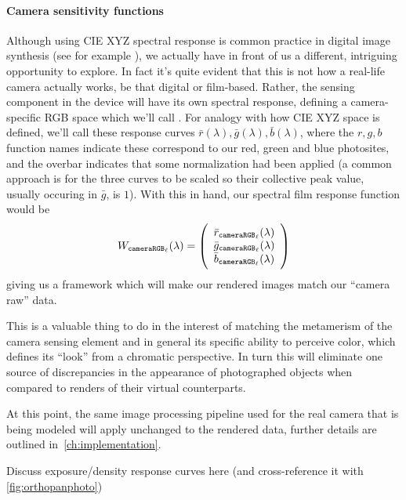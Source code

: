 \paragraph{Camera sensitivity functions}
Although using \gls{CIE} \gls{XYZ} spectral response is common practice
in digital image synthesis (see for example \cite{pharr2023, jakob2022mitsuba3,
ward1994}), we actually have in front of us a different, intriguing opportunity
to explore. 
In fact it's quite evident that this is not how a real-life camera actually works,
be that digital or film-based. 
Rather, the sensing component in the device will have its own spectral response,
defining a camera-specific \gls{RGB} space which we'll call \camRGBl.
For analogy with how \gls{CIE} \gls{XYZ} space is defined, we'll call these
response curves $\bar r(\lambda), \bar g(\lambda), \bar b(\lambda)$, where the 
$r,g,b$ function names indicate these correspond to our red, green and blue photosites, and
the overbar indicates that some normalization had been applied (a common approach is for the 
three curves to be scaled so their collective peak value, usually occuring in $\bar g$, is $1$).
With this in hand, our spectral film response function would be
\begin{equation}
	W_{\texttt{cameraRGB}_\ell}(\lambda) = 
	\left(
	\begin{array}{c}
		\bar r_{\texttt{cameraRGB}_\ell}(\lambda) \\
		\bar g_{\texttt{cameraRGB}_\ell}(\lambda) \\
		\bar b_{\texttt{cameraRGB}_\ell}(\lambda)
	\end{array}
	\right)
\end{equation}
giving us a framework which will make our rendered images match our ``camera raw'' 
data.

This is a valuable thing to do in the interest of matching the metamerism of the 
camera sensing element and in general its specific ability to perceive color, 
which defines its ``look'' from a chromatic perspective. 
In turn this will eliminate one source of discrepancies in the appearance of 
photographed objects when compared to renders of their virtual counterparts.

At this point, the same image processing pipeline used for the real camera
that is being modeled will apply unchanged to the rendered data, further 
details are outlined in~\cref{ch:implementation}.

\begin{inconstruction}
	Discuss exposure/density response curves here
	(and cross-reference it with \cref{fig:orthopanphoto})
\end{inconstruction}


